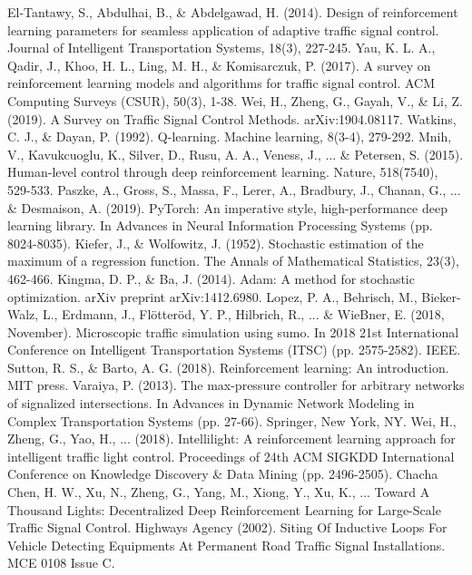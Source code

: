 \documentclass[conference]{IEEEtran}
\begin{document}
\begin{thebibliography}{00}
 El-Tantawy, S., Abdulhai, B., \& Abdelgawad, H. (2014). Design of reinforcement learning parameters for seamless application of adaptive traffic signal control. Journal of Intelligent Transportation Systems, 18(3), 227-245.
 Yau, K. L. A., Qadir, J., Khoo, H. L., Ling, M. H., \& Komisarczuk, P. (2017). A survey on reinforcement learning models and algorithms for traffic signal control. ACM Computing Surveys (CSUR), 50(3), 1-38.
 Wei, H., Zheng, G., Gayah, V., \& Li, Z. (2019). A Survey on Traffic Signal Control Methods. arXiv:1904.08117.
 Watkins, C. J., \& Dayan, P. (1992). Q-learning. Machine learning, 8(3-4), 279-292.
 Mnih, V., Kavukcuoglu, K., Silver, D., Rusu, A. A., Veness, J.,  ... \& Petersen, S. (2015). Human-level control through deep reinforcement learning. Nature, 518(7540), 529-533.
 Paszke, A., Gross, S., Massa, F., Lerer, A., Bradbury, J., Chanan, G., ... \& Desmaison, A. (2019). PyTorch: An imperative style, high-performance deep learning library. In Advances in Neural Information Processing Systems (pp. 8024-8035).
 Kiefer, J., \& Wolfowitz, J. (1952). Stochastic estimation of the maximum of a regression function. The Annals of Mathematical Statistics, 23(3), 462-466.
 Kingma, D. P., \& Ba, J. (2014). Adam: A method for stochastic optimization. arXiv preprint arXiv:1412.6980.
 Lopez, P. A., Behrisch, M., Bieker-Walz, L., Erdmann, J., Flötteröd, Y. P., Hilbrich, R., ... \& WieBner, E. (2018, November). Microscopic traffic simulation using sumo. In 2018 21st International Conference on Intelligent Transportation Systems (ITSC) (pp. 2575-2582). IEEE.
 Sutton, R. S., \& Barto, A. G. (2018). Reinforcement learning: An introduction. MIT press.
 Varaiya, P. (2013). The max-pressure controller for arbitrary networks of signalized intersections. In Advances in Dynamic Network Modeling in Complex Transportation Systems (pp. 27-66). Springer, New York, NY.
 Wei, H., Zheng, G., Yao, H., ... (2018). Intellilight: A reinforcement learning approach for intelligent traffic light control. Proceedings of  24th ACM SIGKDD International Conference on Knowledge Discovery \& Data Mining (pp. 2496-2505).
 Chacha Chen, H. W., Xu, N., Zheng, G., Yang, M., Xiong, Y., Xu, K., ... Toward A Thousand Lights: Decentralized Deep Reinforcement Learning for Large-Scale Traffic Signal Control.
 Highways Agency (2002). Siting Of Inductive Loops For Vehicle Detecting Equipments At Permanent Road Traffic Signal Installations. MCE 0108 Issue C.
\end{thebibliography}
\end{document}
